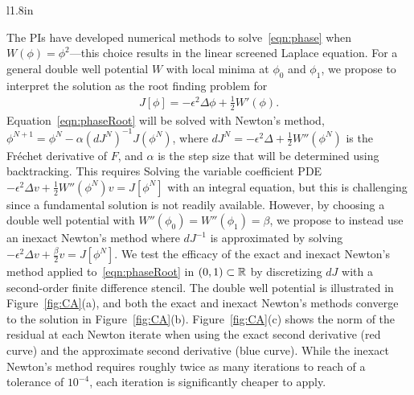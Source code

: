 \begin{wrapfigure}[28]{l}{1.8in}
  \vspace{-8pt}
  \centering
   
  \caption{\label{fig:CA} \footnotesize (a) A double well potential. (b)
  The solution of the one-dimensional phase
  transition~\eqref{eqn:phase}. (c) The convergence of exact and inexact
  Newton's methods.}
\end{wrapfigure}
The PIs have developed numerical methods to solve~\eqref{eqn:phase} when
$W(\phi) = \phi^2$---this choice results in the linear screened Laplace
equation. For a general double well potential $W$ with local minima at
$\phi_0$ and $\phi_1$, we propose to interpret the solution as the root
finding problem for
\begin{align}
  \label{eqn:phaseRoot}
  J[\phi] = -\epsilon^2 \Delta \phi + \tfrac{1}{2}W'(\phi).
\end{align}
Equation~\eqref{eqn:phaseRoot} will be solved with Newton's method,
$\phi^{N+1} = \phi^{N} - \alpha (dJ^N)^{-1} J(\phi^N)$, where $dJ^N =
-\epsilon^2 \Delta + \tfrac{1}{2}W''(\phi^N)$ is the Fr\'{e}chet
derivative of $F$, and $\alpha$ is the step size that will be determined
using backtracking. This requires Solving the variable coefficient PDE
$-\epsilon^2 \Delta v + \tfrac{1}{2}W''(\phi^{N}) v = J[\phi^N]$ with an
integral equation, but this is challenging since a fundamental solution
is not readily available. However, by choosing a double well potential
with $W''(\phi_0) = W''(\phi_1) = \beta$, we propose to instead use an
inexact Newton's method where $dJ^{-1}$ is approximated by solving
$-\epsilon^2 \Delta v + \tfrac{\beta}{2} v = J[\phi^N]$. We test the
efficacy of the exact and inexact Newton's method applied
to~\eqref{eqn:phaseRoot} in $(0,1) \subset \mathbb{R}$ by discretizing $dJ$
with a second-order finite difference stencil. The double well potential
is illustrated in Figure~\ref{fig:CA}(a), and both the exact and inexact
Newton's methods converge to the solution in Figure~\ref{fig:CA}(b).
Figure~\ref{fig:CA}(c) shows the norm of the residual at each Newton
iterate when using the exact second derivative (red curve) and the
approximate second derivative (blue curve). While the inexact Newton's
method requires roughly twice as many iterations to reach of a tolerance
of $10^{-4}$, each iteration is significantly cheaper to apply.

